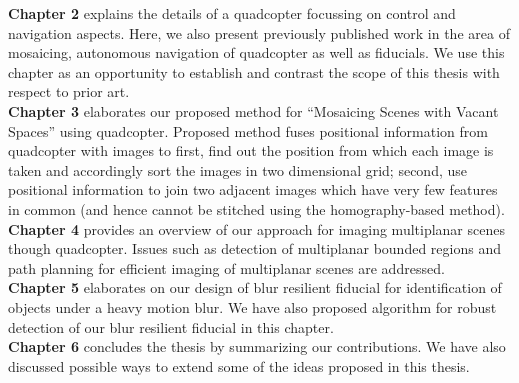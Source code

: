 \noindent \textbf{Chapter 2} explains the details of a quadcopter focussing on
control and navigation aspects. Here, we also present previously published work
in the area of mosaicing, autonomous navigation of quadcopter as well as
fiducials. We use this chapter as an opportunity to establish and contrast the
scope of this thesis with respect to prior art.\\

\noindent \textbf{Chapter 3} elaborates our proposed method for ``Mosaicing
Scenes with Vacant Spaces'' using quadcopter. Proposed method fuses positional information
from quadcopter with images to first, find out the position from which each
image is taken and accordingly sort the images in two dimensional grid; second,
use positional information to join two adjacent images which have very few features
in common (and hence cannot be stitched using the homography-based method).\\

\noindent \textbf{Chapter 4} provides an overview of our approach
for imaging multiplanar scenes though quadcopter. Issues such as detection of
multiplanar bounded regions and path planning for efficient imaging of multiplanar scenes
are addressed.\\

\noindent \textbf{Chapter 5} elaborates on our design of blur
resilient fiducial for identification of objects under a heavy motion blur. We
have also proposed algorithm for robust detection of our blur resilient
fiducial in this chapter.\\
 
 \noindent \textbf{Chapter 6} concludes the thesis by summarizing our
 contributions.
  We have also discussed possible ways to extend some of the ideas proposed in this thesis.
